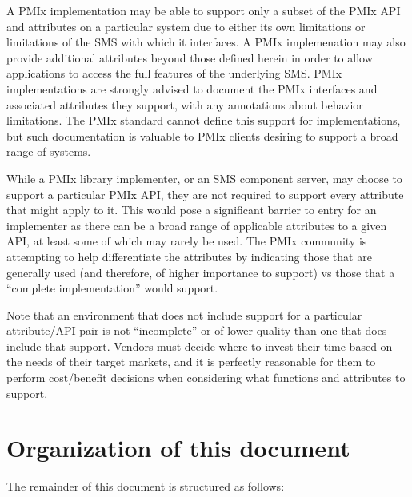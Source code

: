 A \ac{PMIx} implementation may be able to support only a subset of the \ac{PMIx} \acs{API} and attributes on
a particular system due to either its own limitations or limitations of the \ac{SMS} with which it interfaces.
A \ac{PMIx} implemenation may also provide additional attributes beyond those defined herein in order to allow
applications to access the full features of the underlying \ac{SMS}.
\ac{PMIx} implementations are strongly advised to document the \ac{PMIx} interfaces and associated attributes they support, with any annotations about behavior limitations.
The \ac{PMIx} standard cannot define this support for implementations, but such documentation is valuable to \ac{PMIx} clients desiring to support a broad range of systems.

While a \ac{PMIx} library implementer, or an \ac{SMS} component server, may choose to support a particular \ac{PMIx} \ac{API}, they are not required to support every attribute that might apply to it. This would pose a significant barrier to entry for an implementer as there can be a broad range of applicable attributes to a given \ac{API}, at least some of which may rarely be used. The \ac{PMIx} community is attempting to help differentiate the attributes by indicating those that are generally used (and therefore, of higher importance to support) vs those that a ``complete implementation'' would support.

Note that an environment that does not include support for a particular attribute/\ac{API} pair is not ``incomplete'' or of lower quality than one that does include that support. Vendors must decide where to invest their time based on the needs of their target markets, and it is perfectly reasonable for them to perform cost/benefit decisions when considering what functions and attributes to support.

\section{Organization of this document}

The remainder of this document is structured as follows:

